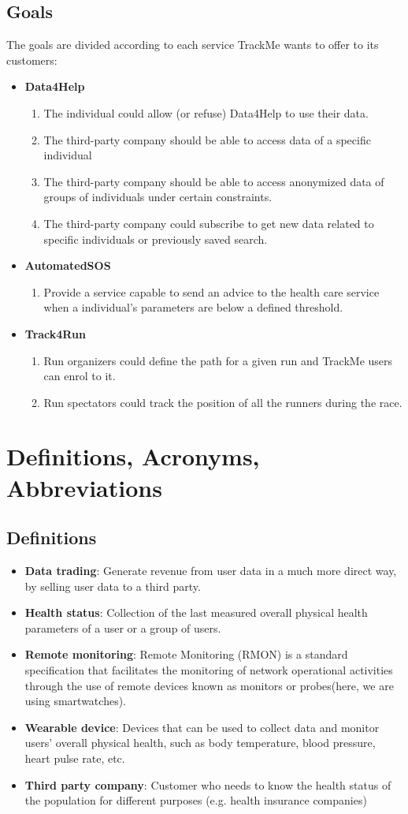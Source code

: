 \documentclass[hidelinks, 12pt]{report}
\newcommand\goal[1]{\item[{[G#1]}] }
\begin{document}
\subsection{Goals}
The goals are divided according to each service TrackMe wants to offer to its customers:
\begin{itemize}
\item{\textbf{Data4Help}}
\begin{enumerate}
\goal{1} The individual could allow (or refuse) Data4Help to use their data.
\goal{2} The third-party company should be able to access data of a specific individual
\goal{3} The third-party company should be able to access anonymized data of groups of individuals under certain constraints.
\goal{4} The third-party company could subscribe to get new data related to specific individuals or previously saved search.
\end{enumerate}

\item{\textbf{AutomatedSOS}}
\begin{enumerate}
\goal{5} Provide a service capable to send an advice to the health care service when a individual's parameters are below a defined threshold.
\end{enumerate}

\item{\textbf{Track4Run}}
\begin{enumerate}
\goal{6} Run organizers could define the path for a given run and TrackMe users can enrol to it.
\goal{7} Run spectators could track the position of all the runners during the race.
\end{enumerate}
\end{itemize}

\section{Definitions, Acronyms, Abbreviations}
\subsection{Definitions}
\begin{itemize}
\item{\textbf{Data trading}}: Generate revenue from user data in a much more direct way, by selling user data to a third party.
\item{\textbf{Health status}}: Collection of the last measured overall physical health parameters of a user or a group of users.
\item{\textbf{Remote monitoring}}: Remote Monitoring (RMON) is a standard specification that facilitates the monitoring of network operational activities through the use of remote devices known as monitors or probes(here, we are using smartwatches).
\item{\textbf{Wearable device}}: Devices that can be used to collect data and monitor users' overall physical health, such as body temperature, blood pressure, heart pulse rate, etc.
\item{\textbf{Third party company}}: Customer who needs to know the health status of the population for different purposes (e.g. health insurance companies)
\end{itemize}
\end{document}

